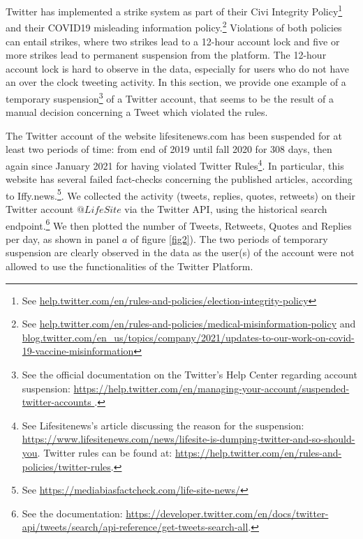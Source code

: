 \documentclass{article}
\begin{document}
Twitter has implemented a strike system as part of their Civi Integrity Policy\footnote{See \href{https://help.twitter.com/en/rules-and-policies/election-integrity-policy}{help.twitter.com/en/rules-and-policies/election-integrity-policy}} and their COVID19 misleading information policy.\footnote{See \href{https://help.twitter.com/en/rules-and-policies/medical-misinformation-policy}{help.twitter.com/en/rules-and-policies/medical-misinformation-policy} and \href{https://blog.twitter.com/en\_us/topics/company/2021/updates-to-our-work-on-covid-19-vaccine-misinformation}{blog.twitter.com/en\_us/topics/company/2021/updates-to-our-work-on-covid-19-vaccine-misinformation}} Violations of both policies can entail strikes, where two strikes lead to a 12-hour account lock and five or more strikes lead to permanent suspension from the platform. The 12-hour account lock is hard to observe in the data, especially for users who do not have an over the clock tweeting activity. In this section, we provide one example of a temporary suspension\footnote{See the official documentation on the Twitter's Help Center regarding account suspension: \href{https://help.twitter.com/en/managing-your-account/suspended-twitter-accounts}{https://help.twitter.com/en/managing-your-account/suspended-twitter-accounts }.} of a Twitter account, that seems to be the result of a manual decision concerning a Tweet which violated the rules. 

The Twitter account of the website lifesitenews.com has been suspended for at least two periods of time: from end of 2019 until fall 2020 for 308 days, then again since January 2021 for having violated Twitter Rules\footnote{See Lifesitenews's article discussing the reason for the suspension: \href{https://www.lifesitenews.com/news/lifesite-is-dumping-twitter-and-so-should-you}{https://www.lifesitenews.com/news/lifesite-is-dumping-twitter-and-so-should-you}. Twitter rules can be found at: \href{https://help.twitter.com/en/rules-and-policies/twitter-rules}{https://help.twitter.com/en/rules-and-policies/twitter-rules}. }. In particular, this website has several failed fact-checks concerning the published articles, according to Iffy.news.\footnote{See \href{https://mediabiasfactcheck.com/life-site-news/}{https://mediabiasfactcheck.com/life-site-news/}}. We collected the activity (tweets, replies, quotes, retweets) on their Twitter account $@LifeSite$ via the Twitter API, using the historical search endpoint.\footnote{See the documentation: \href{https://developer.twitter.com/en/docs/twitter-api/tweets/search/api-reference/get-tweets-search-all}{https://developer.twitter.com/en/docs/twitter-api/tweets/search/api-reference/get-tweets-search-all}.} We then plotted the number of Tweets, Retweets, Quotes and Replies per day, as shown in panel $a$ of figure \ref{fig2}). The two periods of temporary suspension are clearly observed in the data as the user(s) of the account were not allowed to use the functionalities of the Twitter Platform. 
\end{document}
